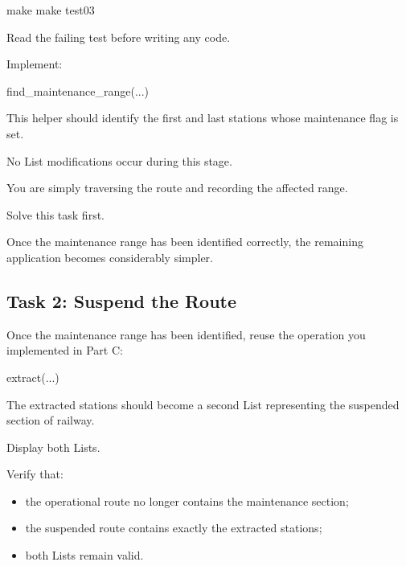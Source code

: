 \documentclass{csc2059practical}
\begin{document}
\begin{terminal}
make
make test03
\end{terminal}

Read the failing test before writing any code.

Implement:

\begin{cppcode}
find_maintenance_range(...)
\end{cppcode}

This helper should identify the first and last stations whose maintenance flag is set.

No List modifications occur during this stage.

You are simply traversing the route and recording the affected range.

\begin{tipbox}
Solve this task first.

Once the maintenance range has been identified correctly, the remaining application becomes considerably simpler.
\end{tipbox}




\subsection{Task 2: Suspend the Route}

Once the maintenance range has been identified, reuse the operation you implemented in Part C:

\begin{cppcode}
extract(...)
\end{cppcode}

The extracted stations should become a second List representing the suspended section of railway.

Display both Lists.

Verify that:

\begin{itemize}
    \item the operational route no longer contains the maintenance section;
    \item the suspended route contains exactly the extracted stations;
    \item both Lists remain valid.
\end{itemize}


\end{document}
